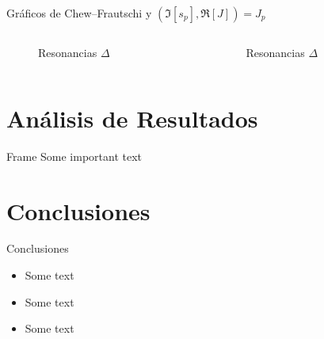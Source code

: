 \documentclass[10pt]{beamer}
\begin{document}
\begin{frame}{Gr\'aficos de Chew--Frautschi y $(\Im[s_p],\Re[J])=J_p$}
\begin{columns}
\begin{column}{0.5\textwidth}
\begin{figure}
	\vspace{-0.7em}
	\caption{Resonancias $\Delta$}
  \end{figure}
  \end{column}
  \begin{column}{0.5\textwidth}
  \begin{figure}
	\centering
	\vspace{-0.7em}
	\caption{Resonancias $\Delta$}
  \end{figure}
  \end{column}
\end{columns}
\end{frame}

\section{An\'alisis de Resultados}
\begin{frame}{Frame}
	\transboxin
	Some important text
\end{frame}



\section{Conclusiones}
\begin{frame}{Conclusiones}
	\begin{itemize}
		\item Some text
		\item Some text
		\item Some text
	\end{itemize}
\end{frame}
\end{document}
